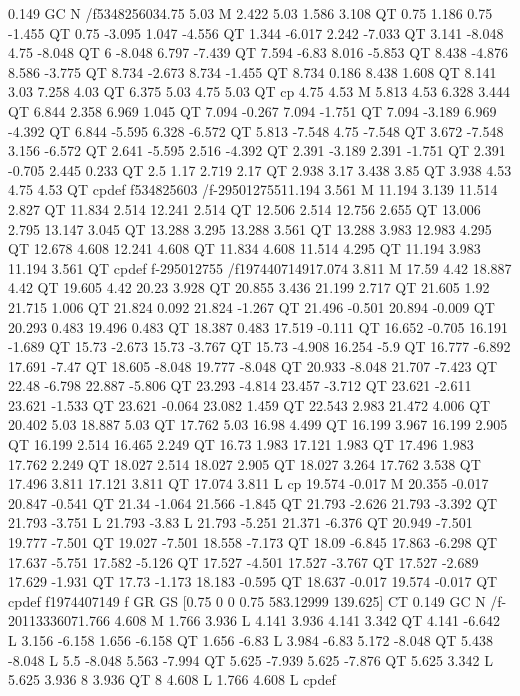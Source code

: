 0.149 GC
N
/f534825603{4.75 5.03 M
2.422 5.03 1.586 3.108 QT
0.75 1.186 0.75 -1.455 QT
0.75 -3.095 1.047 -4.556 QT
1.344 -6.017 2.242 -7.033 QT
3.141 -8.048 4.75 -8.048 QT
6 -8.048 6.797 -7.439 QT
7.594 -6.83 8.016 -5.853 QT
8.438 -4.876 8.586 -3.775 QT
8.734 -2.673 8.734 -1.455 QT
8.734 0.186 8.438 1.608 QT
8.141 3.03 7.258 4.03 QT
6.375 5.03 4.75 5.03 QT
cp
4.75 4.53 M
5.813 4.53 6.328 3.444 QT
6.844 2.358 6.969 1.045 QT
7.094 -0.267 7.094 -1.751 QT
7.094 -3.189 6.969 -4.392 QT
6.844 -5.595 6.328 -6.572 QT
5.813 -7.548 4.75 -7.548 QT
3.672 -7.548 3.156 -6.572 QT
2.641 -5.595 2.516 -4.392 QT
2.391 -3.189 2.391 -1.751 QT
2.391 -0.705 2.445 0.233 QT
2.5 1.17 2.719 2.17 QT
2.938 3.17 3.438 3.85 QT
3.938 4.53 4.75 4.53 QT
cp}def
f534825603
/f-295012755{11.194 3.561 M
11.194 3.139 11.514 2.827 QT
11.834 2.514 12.241 2.514 QT
12.506 2.514 12.756 2.655 QT
13.006 2.795 13.147 3.045 QT
13.288 3.295 13.288 3.561 QT
13.288 3.983 12.983 4.295 QT
12.678 4.608 12.241 4.608 QT
11.834 4.608 11.514 4.295 QT
11.194 3.983 11.194 3.561 QT
cp}def
f-295012755
/f1974407149{17.074 3.811 M
17.59 4.42 18.887 4.42 QT
19.605 4.42 20.23 3.928 QT
20.855 3.436 21.199 2.717 QT
21.605 1.92 21.715 1.006 QT
21.824 0.092 21.824 -1.267 QT
21.496 -0.501 20.894 -0.009 QT
20.293 0.483 19.496 0.483 QT
18.387 0.483 17.519 -0.111 QT
16.652 -0.705 16.191 -1.689 QT
15.73 -2.673 15.73 -3.767 QT
15.73 -4.908 16.254 -5.9 QT
16.777 -6.892 17.691 -7.47 QT
18.605 -8.048 19.777 -8.048 QT
20.933 -8.048 21.707 -7.423 QT
22.48 -6.798 22.887 -5.806 QT
23.293 -4.814 23.457 -3.712 QT
23.621 -2.611 23.621 -1.533 QT
23.621 -0.064 23.082 1.459 QT
22.543 2.983 21.472 4.006 QT
20.402 5.03 18.887 5.03 QT
17.762 5.03 16.98 4.499 QT
16.199 3.967 16.199 2.905 QT
16.199 2.514 16.465 2.249 QT
16.73 1.983 17.121 1.983 QT
17.496 1.983 17.762 2.249 QT
18.027 2.514 18.027 2.905 QT
18.027 3.264 17.762 3.538 QT
17.496 3.811 17.121 3.811 QT
17.074 3.811 L
cp
19.574 -0.017 M
20.355 -0.017 20.847 -0.541 QT
21.34 -1.064 21.566 -1.845 QT
21.793 -2.626 21.793 -3.392 QT
21.793 -3.751 L
21.793 -3.83 L
21.793 -5.251 21.371 -6.376 QT
20.949 -7.501 19.777 -7.501 QT
19.027 -7.501 18.558 -7.173 QT
18.09 -6.845 17.863 -6.298 QT
17.637 -5.751 17.582 -5.126 QT
17.527 -4.501 17.527 -3.767 QT
17.527 -2.689 17.629 -1.931 QT
17.73 -1.173 18.183 -0.595 QT
18.637 -0.017 19.574 -0.017 QT
cp}def
f1974407149
f
GR
GS
[0.75 0 0 0.75 583.12999 139.625] CT
0.149 GC
N
/f-2011333607{1.766 4.608 M
1.766 3.936 L
4.141 3.936 4.141 3.342 QT
4.141 -6.642 L
3.156 -6.158 1.656 -6.158 QT
1.656 -6.83 L
3.984 -6.83 5.172 -8.048 QT
5.438 -8.048 L
5.5 -8.048 5.563 -7.994 QT
5.625 -7.939 5.625 -7.876 QT
5.625 3.342 L
5.625 3.936 8 3.936 QT
8 4.608 L
1.766 4.608 L
cp}def
